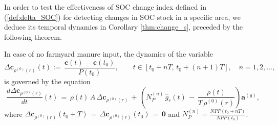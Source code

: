\noindent In order to test the effectiveness of SOC change index defined in (\ref{def:delta_SOC}) for detecting changes in SOC stock in a specific area, we deduce its temporal dynamics in Corollary \ref{thm:change_s}, preceded by the following theorem.
\begin{theorem}\label{thm:forestandgrass}
In case of no farmyard manure input, the dynamics of the variable 
$$\Delta \mathbf{c}_{\rho^{(0)}(r)}(t):= \, \displaystyle \frac{ \mathbf{c}(t)\, -\mathbf{c}(t_0)}{P(t_0)},\quad
\quad  t\in[t_0+nT,\,t_0+(n+1)T], \quad n=1, 2, \dots,$$
is governed by the equation
\begin{equation}\label{eq:change_c}
    \displaystyle \frac{d \Delta \mathbf{c}_{\rho^{(0)}(r)}}{dt}(t)\, =\,  \rho(t) \, A\, \Delta \mathbf{c}_{\rho^{(0)}(r)}\, +\, \left( \displaystyle N_P^{(n)}\, \hat g_r(t) \,-\, \displaystyle \frac{\rho(t)}{T\, \rho^{(0)}(r)}  \right) \mathbf{a}^{(g)}, 
\end{equation}
where $\Delta \mathbf{c}_{\rho^{(0)}(r)}(t_0+T)\, =\, \Delta \mathbf{c}_{\rho^{(0)}(r)}(t_0)\,=\, \mathbf{0}$ and $N_P^{(n)}=\displaystyle \frac{NPP(t_0+nT)}{NPP(t_0)}$.
\end{theorem}
